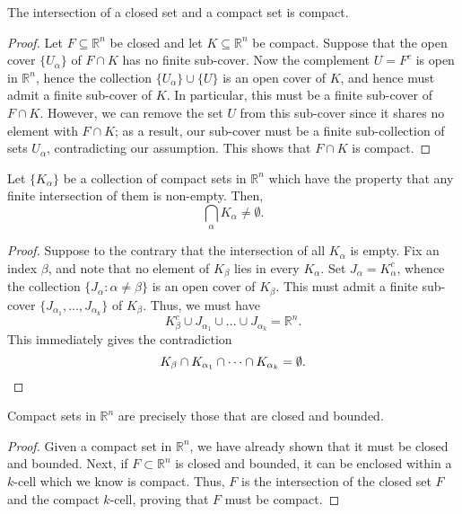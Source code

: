 \documentclass[11pt]{article}
\newcommand{\R}{\mathbb{R}}
\theoremstyle{definition}
\theoremstyle{remark}
\numberwithin{equation}{section}
\begin{document}
    \begin{lemma}
        The intersection of a closed set and a compact set is compact.
    \end{lemma}
    \begin{proof}
        Let $F \subseteq \R^n$ be closed and let $K \subseteq \R^n$ be compact.
        Suppose that the open cover $\{U_\alpha\}$ of $F \cap K$ has no finite
        sub-cover. Now the complement $U = F^c$ is open in $\R^n$, hence the
        collection $\{U_\alpha\} \cup \{U\}$ is an open cover of $K$, and hence must
        admit a finite sub-cover of $K$. In particular, this must be a finite
        sub-cover of $F \cap K$. However, we can remove the set $U$ from this
        sub-cover since it shares no element with $F \cap K$; as a result, our
        sub-cover must be a finite sub-collection of sets $U_\alpha$, contradicting
        our assumption. This shows that $F \cap K$ is compact.
    \end{proof}

    \begin{lemma}
        Let $\{K_\alpha\}$ be a collection of compact sets in $\R^n$ which have the
        property that any finite intersection of them is non-empty. Then, \[
            \bigcap_{\alpha} K_\alpha \neq \emptyset.
        \] 
    \end{lemma}
    \begin{proof}
        Suppose to the contrary that the intersection of all $K_\alpha$ is empty. Fix
        an index $\beta$, and note that no element of $K_\beta$ lies in every
        $K_\alpha$. Set $J_\alpha = K_\alpha^c$, whence the collection $\{J_\alpha :
        \alpha \neq \beta\}$ is an open cover of $K_\beta$. This must admit a finite
        sub-cover $\{J_{\alpha_1},\dots, J_{\alpha_k}\}$ of $K_\beta$. Thus, we must
        have \[
            K_\beta^c \cup J_{\alpha_1} \cup \dots \cup J_{\alpha_k} = \R^n.
        \] This immediately gives the contradiction \[
            K_\beta \cap K_{\alpha_1} \cap \dots \cap K_{\alpha_k} = \emptyset.
            \qedhere
        \] 
    \end{proof}

    \begin{theorem}
        Compact sets in $\R^n$ are precisely those that are closed and bounded.
    \end{theorem}
    \begin{proof}
        Given a compact set in $\R^n$, we have already shown that it must be closed
        and bounded. Next, if $F \subset \R^n$ is closed and bounded, it can be
        enclosed within a $k$-cell which we know is compact. Thus, $F$ is the
        intersection of the closed set $F$ and the compact $k$-cell, proving that
        $F$ must be compact.
    \end{proof}
\end{document}
